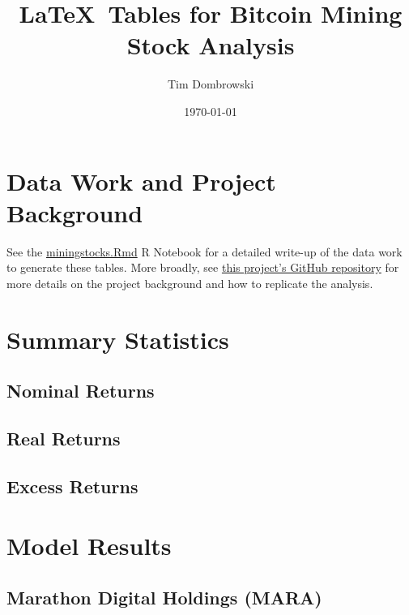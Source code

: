 \documentclass{article}
\title{\LaTeX~Tables for Bitcoin Mining Stock Analysis}
\author{Tim Dombrowski}
\date{\today}
\begin{document}
\maketitle

\large

\section{Data Work and Project Background}

See the \href{https://github.com/tim-dombrowski/bitcoin-miningstocks-project/blob/main/R\%20Notebook/miningstocks.Rmd}{miningstocks.Rmd} R Notebook for a detailed write-up of the data work to generate these tables. More broadly, see \href{https://github.com/tim-dombrowski/bitcoin-miningstocks-project}{this project's GitHub repository} for more details on the project background and how to replicate the analysis.

\section{Summary Statistics}

\subsection{Nominal Returns}



\pagebreak

\subsection{Real Returns}




\subsection{Excess Returns}



\pagebreak

\section{Model Results}

\subsection{Marathon Digital Holdings (MARA)}
\end{document}
